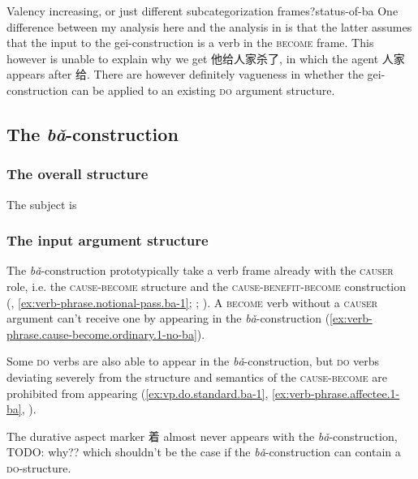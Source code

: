 \documentclass[UTF8, a4paper, oneside, scheme=plain, 12pt]{ctexrep}
\newcommand*{\citepage}[1]{p.~{#1}}
\newcommand*{\citepages}[1]{pp.~{#1}}
\newcommand{\form}[1]{\emph{#1}}
\newcommand*{\category}[1]{\textsc{#1}}
\begin{document}
\begin{infobox}{Valency increasing, or just different subcategorization frames?}{status-of-ba}
    One difference between my analysis here and the analysis in \citet[\citepage{202}]{deng2010formal}
    is that the latter assumes that the input to the gei-construction 
    is a verb in the \category{become} frame.
    This however is unable to explain why we get 他给人家杀了,
    in which the agent 人家 appears after 给.
    There are however definitely vagueness in whether 
    the gei-construction can be applied to an existing \category{do} argument structure.
\end{infobox}


\subsection{The \form{bǎ}-construction}\label{sec:verb-phrase.object.ba}

\subsubsection{The overall structure}

The subject is 


\subsubsection{The input argument structure}
\label{sec:verb-phrase.object.ba.cause-become}

The \form{bǎ}-construction
prototypically take a verb frame already with the \category{causer} role,  
i.e. the \category{cause}-\category{become} structure
and the \category{cause}-\category{benefit}-\category{become} construction
(, 
\ref{ex:verb-phrase.notional-pass.ba-1};
;
\citealt[\citepages{98-99}]{deng2010formal}).
A \category{become} verb without a \category{causer} argument 
can't receive one by appearing in the \form{bǎ}-construction
(\ref{ex:verb-phrase.cause-become.ordinary.1-no-ba}).

Some \category{do} verbs are also able 
to appear in the \form{bǎ}-construction, 
but \category{do} verbs deviating severely from the structure and semantics of  
the \category{cause}-\category{become} 
are prohibited from appearing
(\ref{ex:vp.do.standard.ba-1}, 
\ref{ex:verb-phrase.affectee.1-ba},
).

The durative aspect marker 着 almost never appears 
with the \form{bǎ}-construction, TODO: why?? 
which shouldn't be the case 
if the \form{bǎ}-construction can contain a \category{do}-structure.
\end{document}
